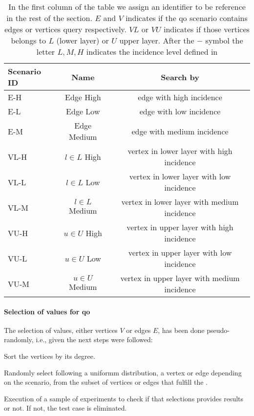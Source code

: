 \begin{table}[H]
  \centering
  \begin{tabular}{|l|c|c|}
    \hline
    \textbf{Scenario ID} & \textbf{Name} & \textbf{Search by}\\
    \hline
    E-H & Edge High & edge with high incidence \\
    \hline
    E-L & Edge Low & edge with low incidence \\
    \hline
    E-M & Edge Medium & edge with medium incidence \\
    \hline
    VL-H & $l \in L$ High & vertex in lower layer with high incidence \\
    \hline
    VL-L & $l \in L$ Low & vertex in lower layer with low incidence \\
    \hline
    VL-M & $l \in L$ Medium & vertex in lower layer with medium incidence \\
    \hline
    VU-H & $u \in U$ High & vertex in upper layer with high incidence \\
    \hline
    VU-L & $u \in U$ Low & vertex in upper layer with low incidence \\
    \hline
    VU-M & $u \in U$ Medium & vertex in upper layer with medium incidence \\
    \hline
  \end{tabular}
  \caption[{[EE] Experiment Data Setup for experiments}]{In the first column of the table we assign an identifier to be reference in the rest of the section. $E$ and $V$ indicates if the \acrshort{qo} scenario contains edges or vertices query respectively. $VL$ or $VU$ indicates if those vertices belongs to $L$ (lower layer) or $U$ upper layer. After the $-$ symbol the letter $L,M,H$ indicates the incidence level defined in }
  \label{table:exp:data-setup}
  \end{table}

\paragraph{Selection of values for \acrshort{qo}}\label{sub:exp:sel-vals} The selection of values, either vertices $V$ or edges $E$, has been done pseudo-randomly, i.e., given  the next steps were followed: \begin{inparaenum}[\bf i\upshape)]
  \item Sort the vertices by its degree.
  \item Randomly select following a uniformm distribution,  a vertex or edge depending on the scenario, from the subset of vertices or edges that fulfill the .
  \item Execution of a sample of experiments to check if that selections provides results or not. If not, the test case is eliminated.
\end{inparaenum}
  
